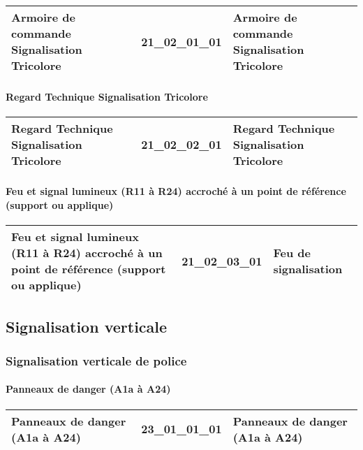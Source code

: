 \documentclass[12pt,titlepage,oneside]{book}
\begin{document}
\renewcommand{\arraystretch}{1.2}
\begin{supertabular}{|p{10cm}|c|p{15cm}|}
 Armoire de commande Signalisation Tricolore & 21\_02\_01\_01 & Armoire de commande Signalisation Tricolore\\
\hline
\end{supertabular}


\paragraph{Regard Technique Signalisation Tricolore}
\noindent
\vspace{\baselineskip}

\renewcommand{\arraystretch}{1.2}
\begin{supertabular}{|p{10cm}|c|p{15cm}|}
 Regard Technique Signalisation Tricolore & 21\_02\_02\_01 & Regard Technique Signalisation Tricolore\\
\hline
\end{supertabular}


\paragraph{Feu et signal lumineux (R11 à R24) accroché à un point de référence (support ou applique)}
\noindent
\vspace{\baselineskip}

\renewcommand{\arraystretch}{1.2}
\begin{supertabular}{|p{10cm}|c|p{15cm}|}
 Feu et signal lumineux (R11 à R24) accroché à un point de référence (support ou applique) & 21\_02\_03\_01 & Feu de signalisation\\
\hline
\end{supertabular}
\subsection{Signalisation verticale}
\subsubsection{\large Signalisation verticale de police}
\paragraph{Panneaux de danger (A1a à A24)}
\noindent
\vspace{\baselineskip}

\renewcommand{\arraystretch}{1.2}
\begin{supertabular}{|p{10cm}|c|p{15cm}|}
 Panneaux de danger (A1a à A24) & 23\_01\_01\_01 & Panneaux de danger (A1a à A24)\\
\hline
\end{supertabular}
\end{document}
